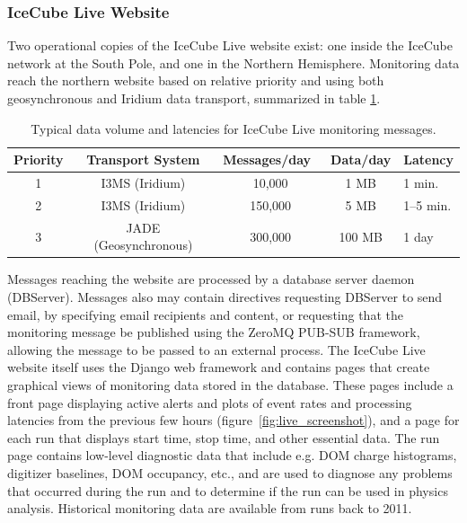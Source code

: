 \subsubsection{IceCube Live Website}

Two operational copies of the IceCube Live website exist: one inside the
IceCube network at the South Pole, and one in the Northern Hemisphere.
Monitoring data reach the northern website based on relative priority and using
both geosynchronous and Iridium data transport, summarized in table
\ref{i3messages}.

\begin{table}[!ht]
  \centering
  \caption{Typical data volume and latencies for IceCube Live monitoring
    messages.} 
  \label{i3messages}  
  \begin{tabularx}{0.85\textwidth}{|c|c|c|c|X|}
    \hline Priority & Transport System & Messages/day~ & Data/day & Latency\\
    \hline 1 & I3MS (Iridium) & 10,000 & 1 MB & 1 min. \\
    \hline 2 & I3MS (Iridium) & 150,000 & 5 MB & 1--5 min. \\
    \hline 3 & JADE (Geosynchronous) & 300,000 & 100 MB & 1 day \\
    \hline
  \end{tabularx}
\end{table}

Messages reaching the website are processed by a database server daemon
(DBServer).  Messages also may contain directives requesting DBServer to send email, by
specifying email recipients and content, or requesting that the monitoring
message be published using the ZeroMQ PUB-SUB framework, allowing the message to be
passed to an external process.  The IceCube Live website itself uses the
Django web framework and contains pages that create graphical views of
monitoring data stored in the database.  These pages include a front page
displaying active alerts and plots of event rates and processing latencies
from the previous few hours (figure~\ref{fig:live_screenshot}), and a page
for each run that displays start  
time, stop time, and other essential data.  The run page contains low-level
diagnostic data that include e.g. DOM charge histograms, digitizer baselines,
DOM occupancy, etc., and are used to diagnose any problems that occurred
during the run and to determine if the run can be used in physics
analysis.  Historical monitoring data are available from runs back to
2011.  

